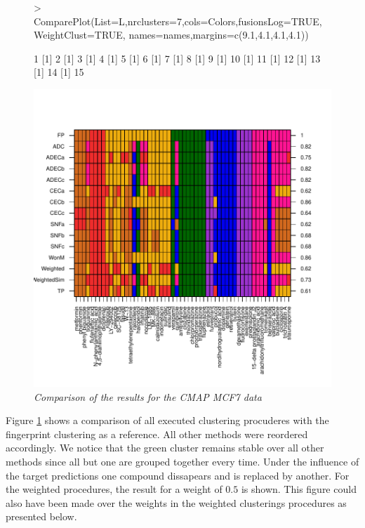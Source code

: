 \documentclass[a4paper]{article}
\begin{document}
\newpage
\begin{figure}[!h] 
\centering
\begin{Schunk}
\begin{Sinput}
> ComparePlot(List=L,nrclusters=7,cols=Colors,fusionsLog=TRUE,WeightClust=TRUE,
             names=names,margins=c(9.1,4.1,4.1,4.1))
\end{Sinput}
\begin{Soutput}
[1] 1
[1] 2
[1] 3
[1] 4
[1] 5
[1] 6
[1] 7
[1] 8
[1] 9
[1] 10
[1] 11
[1] 12
[1] 13
[1] 14
[1] 15
\end{Soutput}
\end{Schunk}
\includegraphics{IntClustVignette-ComparePlot1}
\caption{{\it Comparison of the results for the CMAP MCF7 data}\label{MCF7_All}}
\end{figure}
\noindent Figure \ref{MCF7_All} shows a comparison of all executed clustering
procuderes with the fingerprint clustering as a reference. All other methods were reordered
accordingly. We notice that the green cluster remains stable over all other
methods since all  but one are grouped together every time. Under the influence
of the target predictions one compound dissapears and is replaced by another.
For the weighted procedures, the result for a weight of $0.5$ is shown. This
figure could also have been made over the weights in the weighted clusterings
procedures as presented below.
\end{document}
